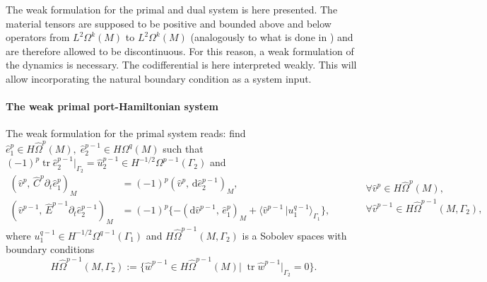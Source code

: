 \documentclass{elsarticle}
\renewcommand\d{\ensuremath{\mathrm{d}}}
\DeclareMathOperator{\tr}{tr}
\newcommand*{\dual}[1]{\ensuremath{\widehat{#1}}}
\newcommand{\inpr}[3][]{\ensuremath{( #2, \, #3 )_{#1}}}
\newcommand{\dualpr}[3][]{\ensuremath{\langle #2 \, \vert #3 \rangle_{#1}}}
\begin{document}
{The weak formulation for the primal and dual system is here presented. The material tensors are supposed to be positive and bounded above and below operators from $L^2\Omega^k(M)$ to $L^2\Omega^k(M)$ (analogously to what is done in \cite[Sec. 7.3]{arnold2006acta}) and are therefore allowed to be discontinuous. For this reason, a weak formulation of the dynamics is necessary. The codifferential is here interpreted weakly. This will allow incorporating the natural boundary condition as a system input.


\paragraph{The weak primal port-Hamiltonian system}
The weak formulation for the primal system reads: find $\dual{e}^p_1 \in H\dual{\Omega}^{p}(M), \; \dual{e}^{p-1}_2 \in H\Omega^{q}(M)$ such that $(-1)^p \tr \dual{e}^{p-1}_2 \vert_{\Gamma_2} = \dual{u}^{p-1}_2 \in H^{-1/2}\Omega^{p-1}(\Gamma_2)$ and
 \begin{equation}\label{eq:weak_primalPH}
    \begin{aligned}
    \inpr[M]{\dual{v}^p}{\dual{C}^p \partial_t \dual{e}^p_1} &= (-1)^{p}\inpr[M]{\dual{v}^p}{\d \dual{e}^{p-1}_2}, \\
     \inpr[M]{\dual{v}^{p-1}}{\dual{E}^{p-1} \partial_t \dual{e}^{p-1}_2} &= (-1)^{p} \{- \inpr[M]{\d\dual{v}^{p-1}}{\dual{e}^p_1} + \dualpr[\Gamma_1]{\dual{v}^{p-1}}{u^{q-1}_1}\},
    \end{aligned}  \qquad 
    \begin{aligned}
    &\forall \dual{v}^p \in H\dual{\Omega}^p(M), \\
    &\forall \dual{v}^{p-1} \in H\dual{\Omega}^{p-1}(M, \Gamma_2), \\
    \end{aligned}
 \end{equation}
where $u_1^{q-1} \in H^{-1/2}\Omega^{q-1}(\Gamma_1)$ and $H\dual{\Omega}^{p-1}(M, \Gamma_2)$ is a Sobolev spaces with boundary conditions 
\begin{equation}
        H\dual{\Omega}^{p-1}(M, \Gamma_2) := \{\dual{w}^{p-1} \in H\dual{\Omega}^{p-1}(M) \vert \; \tr \dual{w}^{p-1}\vert_{\Gamma_2} = 0 \}. 
\end{equation}

}
\end{document}
